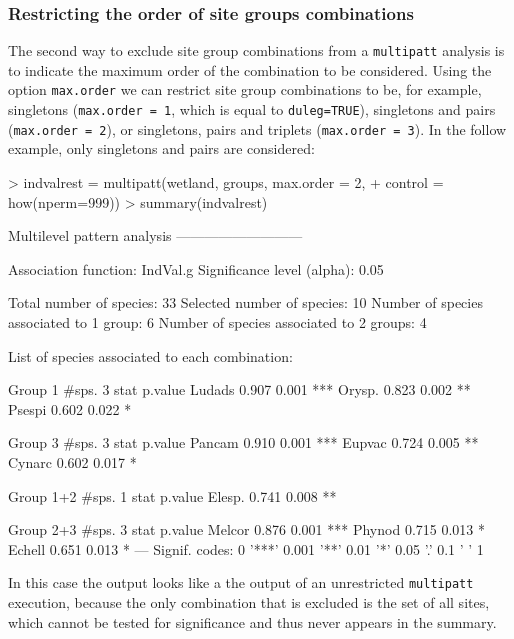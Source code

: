 \documentclass[11pt,a4paper]{article}
\begin{document}
\subsubsection{Restricting the order of site groups combinations}
The second way to exclude site group combinations from a \texttt{multipatt} analysis is to indicate the maximum order of the combination to be considered. Using the option \texttt{max.order} we can restrict site group combinations to be, for example, singletons (\texttt{max.order = 1}, which is equal to \texttt{duleg=TRUE}), singletons and pairs (\texttt{max.order = 2}), or singletons, pairs and triplets (\texttt{max.order = 3}). In the follow example, only singletons and pairs are considered: 
\begin{Schunk}
\begin{Sinput}
> indvalrest = multipatt(wetland, groups, max.order = 2, 
+                        control = how(nperm=999)) 
> summary(indvalrest)
\end{Sinput}
\begin{Soutput}
 Multilevel pattern analysis
 ---------------------------

 Association function: IndVal.g
 Significance level (alpha): 0.05

 Total number of species: 33
 Selected number of species: 10 
 Number of species associated to 1 group: 6 
 Number of species associated to 2 groups: 4 

 List of species associated to each combination: 

 Group 1  #sps.  3 
        stat p.value    
Ludads 0.907   0.001 ***
Orysp. 0.823   0.002 ** 
Psespi 0.602   0.022 *  

 Group 3  #sps.  3 
        stat p.value    
Pancam 0.910   0.001 ***
Eupvac 0.724   0.005 ** 
Cynarc 0.602   0.017 *  

 Group 1+2  #sps.  1 
        stat p.value   
Elesp. 0.741   0.008 **

 Group 2+3  #sps.  3 
        stat p.value    
Melcor 0.876   0.001 ***
Phynod 0.715   0.013 *  
Echell 0.651   0.013 *  
---
Signif. codes:  0 '***' 0.001 '**' 0.01 '*' 0.05 '.' 0.1 ' ' 1 
\end{Soutput}
\end{Schunk}
In this case the output looks like a the output of an unrestricted \texttt{multipatt} execution, because the only combination that is excluded is the set of all sites, which cannot be tested for significance and thus never appears in the summary. 
\end{document}
